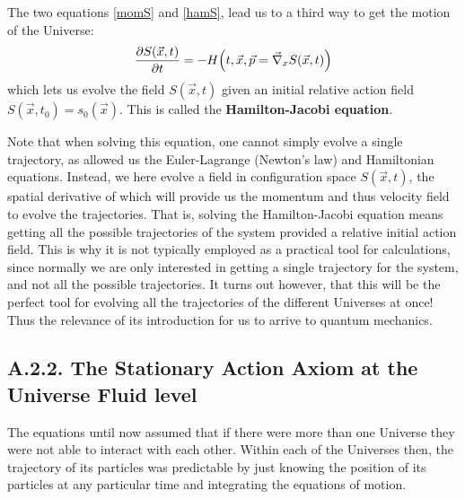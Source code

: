 \documentclass[11pt, a4paper]{article} %
\begin{document}
The two equations \eqref{momS} and \eqref{hamS}, lead us to a third way to get the motion of the Universe:
\begin{equation}
\pdv{S(\vec{x},t)}{t}=-H\qty(t, \vec{x}, \vec{p}=\vec{\nabla}_{x}S(\vec{x},t))
\end{equation}
which lets us evolve the field $S(\vec{x},t)$ given an initial relative action field $S(\vec{x},t_0)=s_0(\vec{x})$. This is called the {\bf Hamilton-Jacobi equation}. 

Note that when solving this equation, one cannot simply evolve a single trajectory, as allowed us the Euler-Lagrange (Newton's law) and Hamiltonian equations. Instead, we here evolve a field in configuration space $S(\vec{x},t)$, the spatial derivative of which will provide us the momentum and thus velocity field to evolve the trajectories. That is, solving the Hamilton-Jacobi equation means getting all the possible trajectories of the system provided a relative initial action field. This is why it is not typically employed as a practical tool for calculations, since normally we are only interested in getting a single trajectory for the system, and not all the possible trajectories. It turns out however, that this will be the perfect tool for evolving all the trajectories of the different Universes at once! Thus the relevance of its introduction for us to arrive to quantum mechanics.

\subsection*{A.2.2. The Stationary Action Axiom at the Universe Fluid level}


The equations until now assumed that if there were more than one Universe they were not able to interact with each other. Within each of the Universes then, the trajectory of its particles was predictable by just knowing the position of its particles at any particular time and integrating the equations of motion. 
\end{document}
